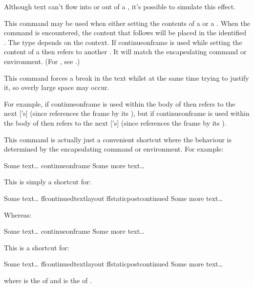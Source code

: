 \documentclass[fontsize=12pt]{scrbook}
\begin{document}
Although text can't flow into or out of a , it's
possible to simulate this effect.

This command may be used when either setting the contents of a
 or a . When the command is
encountered, the content that follows will be placed in the
identified . The  type depends on the
context. If \gls{continueonframe} is used while setting the content
of a  then  refers to another
. It will match the encapsulating command or
environment. (For , see
.)

\begin{warning}
This command forces a break in the text whilst at the same time
trying to justify it, so overly large space may occur.
\end{warning}

For example, if \gls{continueonframe} is used within the body of
 then  refers to the next
['s]  (since 
references the frame by its ), but if \gls{continueonframe}
is used within the body of  then 
refers to the next ['s]  (since
 references the frame by its ).

This command is actually just a convenient shortcut where the
behaviour is determined by the encapsulating command or environment.
For example:
\begin{codebox}
Some text\ldots{}
\gls{continueonframe}
Some more text\ldots{}
\end{codebox}
This is simply a shortcut for:
\begin{codebox}
Some text\ldots{}
\gls{ffcontinuedtextlayout}
\gls{ffstaticpostcontinued}
Some more text\ldots{}
\end{codebox}
Whereas:
\begin{codebox}
Some text\ldots{}
\gls{continueonframe}
Some more text\ldots{}
\end{codebox}
This is a shortcut for:
\begin{codebox}
Some text\ldots{}
\gls{ffcontinuedtextlayout}
\gls{ffstaticpostcontinued}
Some more text\ldots{}
\end{codebox}%
where  is the  of  and
 is the  of .
\end{document}
